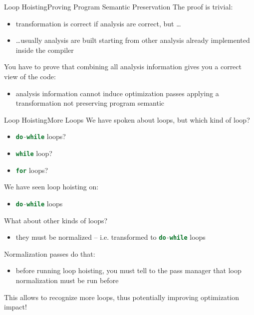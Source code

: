 \documentclass[10pt,mathserif]{beamer}
\newcommand{\cinline}[1]{\lstinline[language=C]!#1!}
\begin{document}
\begin{frame}{Loop Hoisting}{Proving Program Semantic Preservation}
The proof is trivial:

\begin{itemize}
\item transformation is correct if analysis are correct, but \ldots
\item \ldots usually analysis are built starting from other analysis already
      implemented inside the compiler
\end{itemize}

You have to prove that combining all analysis information gives you a
correct view of the code:

\begin{itemize}
\item analysis information cannot induce optimization passes applying a
      transformation not preserving program semantic
\end{itemize}
\end{frame}

\begin{frame}{Loop Hoisting}{More Loops}
We have spoken about loops, but which kind of loop?

\begin{itemize}
\item \cinline{do-while} loops?
\item \cinline{while} loop?
\item \cinline{for} loops?
\end{itemize}

We have seen loop hoisting on:

\begin{itemize}
\item \cinline{do-while} loops
\end{itemize}

What about other kinds of loops?

\begin{itemize}
\item they must be normalized -- i.e. transformed to \cinline{do-while} loops
\end{itemize}

\alert{Normalization passes} do that:

\begin{itemize}
\item before running loop hoisting, you must tell to the pass manager that loop
      normalization must be run before
\end{itemize}

This allows to recognize more loops, thus potentially improving optimization
impact!
\end{frame}
\end{document}
